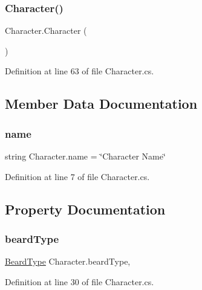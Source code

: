 \subsubsection{\texorpdfstring{Character()}{Character()}}
{\footnotesize\ttfamily Character.\+Character (\begin{DoxyParamCaption}{ }\end{DoxyParamCaption})}



Definition at line 63 of file Character.\+cs.



\subsection{Member Data Documentation}
\mbox{\label{class_character_adbfa3b858f99f337203a1bec67b2fe45}} 
\subsubsection{\texorpdfstring{name}{name}}
{\footnotesize\ttfamily string Character.\+name = \char`\"{}Character Name\char`\"{}}



Definition at line 7 of file Character.\+cs.



\subsection{Property Documentation}
\mbox{\label{class_character_a77735a4eeb0530c85de8e53145cb6044}} 
\subsubsection{\texorpdfstring{beardType}{beardType}}
{\footnotesize\ttfamily \mbox{\hyperlink{class_character_afc1fe7f790870a92fe62d3e57296de81}{Beard\+Type}} Character.\+beard\+Type\hspace{0.3cm}{\ttfamily [get]}, {\ttfamily [set]}}



Definition at line 30 of file Character.\+cs.

\mbox{\label{class_character_a470cb22e12212f2cb43f77b1c06445d3}} 
